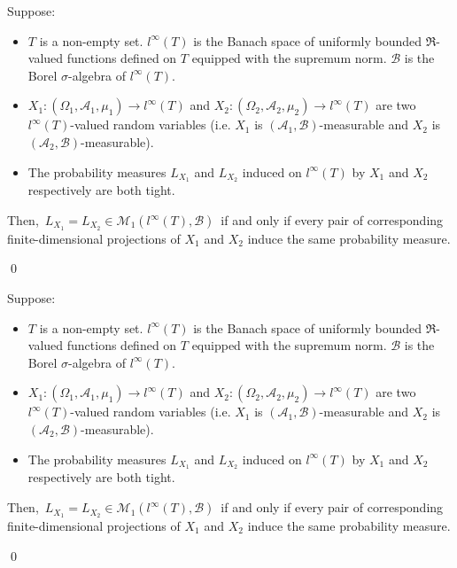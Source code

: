 \begin{lemma}
\mbox{}\vskip 0.1cm
\noindent
Suppose:
\begin{itemize}
\item
	$T$ is a non-empty set.
	$l^{\infty}(T)$ is the Banach space of uniformly bounded $\Re$-valued functions defined on $T$
	equipped with the supremum norm.
	$\mathcal{B}$ is the Borel $\sigma$-algebra of $l^{\infty}(T)$.
\item
	$X_{1} : (\Omega_{1},\mathcal{A}_{1},\mu_{1}) \longrightarrow l^{\infty}(T)$
	and
	$X_{2} : (\Omega_{2},\mathcal{A}_{2},\mu_{2}) \longrightarrow l^{\infty}(T)$
	are two $l^{\infty}(T)$-valued random variables
	(i.e. $X_{1}$ is $(\mathcal{A}_{1},\mathcal{B})$-measurable and
	$X_{2}$ is $(\mathcal{A}_{2},\mathcal{B})$-measurable).
\item
	The probability measures $L_{X_{1}}$ and $L_{X_{2}}$ induced on $l^{\infty}(T)$
	by $X_{1}$ and $X_{2}$ respectively are both tight.
\end{itemize}
Then,
\,$L_{X_{1}} = L_{X_{2}} \in \mathcal{M}_{1}(l^{\infty}(T),\mathcal{B})$\,
if and only if
every pair of corresponding finite-dimensional projections of $X_{1}$ and $X_{2}$
induce the same probability measure.
\end{lemma}
\proof
\qed


\begin{theorem}
\mbox{}\vskip 0.1cm
\noindent
Suppose:
\begin{itemize}
\item
	$T$ is a non-empty set.
	$l^{\infty}(T)$ is the Banach space of uniformly bounded $\Re$-valued functions defined on $T$
	equipped with the supremum norm.
	$\mathcal{B}$ is the Borel $\sigma$-algebra of $l^{\infty}(T)$.
\item
	$X_{1} : (\Omega_{1},\mathcal{A}_{1},\mu_{1}) \longrightarrow l^{\infty}(T)$
	and
	$X_{2} : (\Omega_{2},\mathcal{A}_{2},\mu_{2}) \longrightarrow l^{\infty}(T)$
	are two $l^{\infty}(T)$-valued random variables
	(i.e. $X_{1}$ is $(\mathcal{A}_{1},\mathcal{B})$-measurable and
	$X_{2}$ is $(\mathcal{A}_{2},\mathcal{B})$-measurable).
\item
	The probability measures $L_{X_{1}}$ and $L_{X_{2}}$ induced on $l^{\infty}(T)$
	by $X_{1}$ and $X_{2}$ respectively are both tight.
\end{itemize}
Then,
\,$L_{X_{1}} = L_{X_{2}} \in \mathcal{M}_{1}(l^{\infty}(T),\mathcal{B})$\,
if and only if
every pair of corresponding finite-dimensional projections of $X_{1}$ and $X_{2}$
induce the same probability measure.
\end{theorem}
\proof
\qed


\renewcommand{\theenumi}{\roman{enumi}}
\renewcommand{\labelenumi}{\textnormal{(\theenumi)}$\;\;$}

